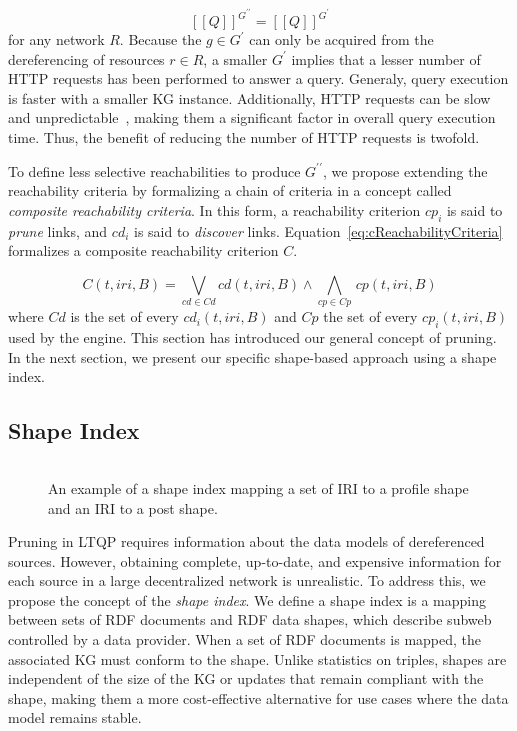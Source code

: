 \begin{equation}\label{eq:evalQueryStructuralAssumption}
   [\![ Q ]\!]^{G^{\prime\prime}} = [\![ Q ]\!]^{G^{\prime}}
\end{equation}
for any network $R$.
Because the $g \in G^{\prime}$ can only be acquired from the dereferencing of resources $r \in R$, a smaller $G^\prime$ implies that a lesser number of HTTP requests has been performed to answer a query.
Generaly, query execution is faster with a smaller KG instance.
Additionally, HTTP requests can be slow and unpredictable~\cite{hartig2016walking}, making them a significant factor in overall query execution time. 
Thus, the benefit of reducing the number of HTTP requests is twofold.

To define less selective reachabilities to produce $G^{\prime\prime}$, we propose extending the reachability criteria by formalizing a chain of criteria in a concept called \emph{composite reachability criteria}.
In this form, a reachability criterion $cp_i$ is said to \emph{prune} links, and $cd_i$ is said to \emph{discover} links.
Equation~\ref{eq:cReachabilityCriteria} formalizes a composite reachability criterion $C$.

\begin{equation}\label{eq:cReachabilityCriteria}
   C(t, iri, B) = \bigvee_{cd \in Cd} cd(t, iri, B) \mathrel{\land} \bigwedge_{cp \in Cp} \, cp(t, iri, B)
\end{equation}
where $Cd$ is the set of every $cd_i(t, iri, B)$ and $Cp$ the set of every $cp_i(t, iri, B)$ used by the engine.
This section has introduced our general concept of pruning. 
In the next section, we present our specific shape-based approach using a shape index.

\subsection{Shape Index}
\begin{figure}
   \centering
   \begin{tabular}{c}
      
   \end{tabular}
   \caption{
      An example of a shape index mapping a set of IRI to a profile shape and an IRI to a post shape.
   }
\end{figure}
Pruning in LTQP requires information about the data models of dereferenced sources.
However, obtaining complete, up-to-date, and expensive information for each source in a large decentralized network is unrealistic.
To address this, we propose the concept of the \emph{shape index}. 
We define a shape index is a mapping between sets of RDF documents and RDF data shapes, which describe subweb controlled by a data provider.
When a set of RDF documents is mapped, the associated KG must conform to the shape.
Unlike statistics on triples, shapes are independent of the size of the KG or updates that remain compliant with the shape, making them a more cost-effective alternative for use cases where the data model remains stable. 

